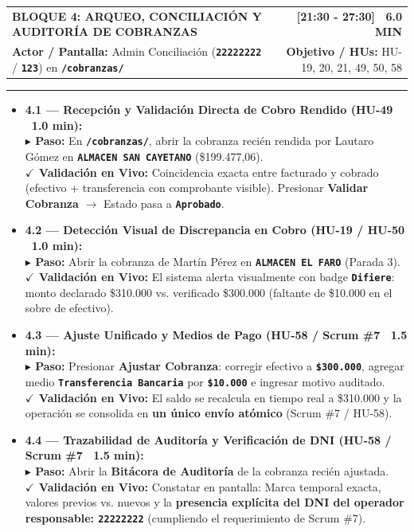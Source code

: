 \documentclass[a4paper,9pt]{article}
\makeatletter
\newcommand{\stepact}[1]{\textbf{$\blacktriangleright$ Paso:} #1}
\newcommand{\valact}[1]{\textbf{$\checkmark$ Validación en Vivo:} #1}
\newcommand{\codeb}[1]{\texttt{\bfseries #1}}
\newcommand{\blockheader}[4]{%
  \begin{tabularx}{\textwidth}{@{}X r@{}}
    {\fontsize{10.5pt}{12.5pt}\selectfont\textbf{#1}} & {\normalsize\textbf{#2}} \\
    {\footnotesize\textbf{Actor / Pantalla:} #3} & {\footnotesize\textbf{Objetivo / HUs:} #4}
  \end{tabularx}%
  \vspace{-2pt}\hrule\vspace{3.5pt}%
}
\makeatother
\begin{document}
\begin{tcolorbox}[cardframe, top=3pt, bottom=3pt, left=6pt, right=6pt]
\blockheader{BLOQUE 4: ARQUEO, CONCILIACIÓN Y AUDITORÍA DE COBRANZAS}{[21:30 - 27:30] \textbar\ 6.0 MIN}{Admin Conciliación (\codeb{22222222} / \codeb{123}) en \codeb{/cobranzas/}}{HU-19, 20, 21, 49, 50, 58}

{\small
\begin{itemize}[leftmargin=11pt, itemsep=4pt]

\item \textbf{4.1 — Recepción y Validación Directa de Cobro Rendido (HU-49 \textbar\ 1.0 min):} \\
\stepact{En \codeb{/cobranzas/}, abrir la cobranza recién rendida por Lautaro Gómez en \codeb{ALMACEN SAN CAYETANO} (\$199.477,06).} \\
\valact{Coincidencia exacta entre facturado y cobrado (efectivo + transferencia con comprobante visible). Presionar \textbf{Validar Cobranza} $\rightarrow$ Estado pasa a \codeb{Aprobado}.}

\item \textbf{4.2 — Detección Visual de Discrepancia en Cobro (HU-19 / HU-50 \textbar\ 1.0 min):} \\
\stepact{Abrir la cobranza de Martín Pérez en \codeb{ALMACEN EL FARO} (Parada 3).} \\
\valact{El sistema alerta visualmente con badge \codeb{Difiere}: monto declarado \$310.000 vs. verificado \$300.000 (faltante de \$10.000 en el sobre de efectivo).}

\item \textbf{4.3 — Ajuste Unificado y Medios de Pago (HU-58 / Scrum \#7 \textbar\ 1.5 min):} \\
\stepact{Presionar \textbf{Ajustar Cobranza}: corregir efectivo a \codeb{\$300.000}, agregar medio \codeb{Transferencia Bancaria} por \codeb{\$10.000} e ingresar motivo auditado.} \\
\valact{El saldo se recalcula en tiempo real a \$310.000 y la operación se consolida en \textbf{un único envío atómico} (Scrum \#7 / HU-58).}

\item \textbf{4.4 — Trazabilidad de Auditoría y Verificación de DNI (HU-58 / Scrum \#7 \textbar\ 1.5 min):} \\
\stepact{Abrir la \textbf{Bitácora de Auditoría} de la cobranza recién ajustada.} \\
\valact{Constatar en pantalla: Marca temporal exacta, valores previos vs. nuevos y la \textbf{presencia explícita del DNI del operador responsable: \codeb{22222222}} (cumpliendo el requerimiento de Scrum \#7).}


\end{itemize}}
\end{tcolorbox}
\end{document}
